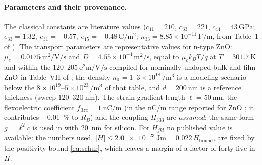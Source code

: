 \paragraph{Parameters and their provenance.}\label{sec:params}
The classical constants are literature values ($c_{11}=210$, $c_{33}=221$, $c_{44}=43\,\si{\giga\pascal}$; $e_{33}=1.32$, $e_{31}=-0.57$, $e_{15}=-0.48\,\si{\coulomb\per\square\metre}$; $\kappa_{33}=8.85\times10^{-11}\,\si{\farad\per\metre}$, from Table~1 of \cite{zhang2025pscplate}).  The transport parameters are representative values for n-type ZnO: $\mu_e=0.0175\,\si{\square\metre\per\volt\per\second}$ and $D=4.55\times10^{-4}\,\si{\square\metre\per\second}$, equal to $\mu_ek_BT/q$ at $T=\SI{301.7}{\kelvin}$ and within the $120$--$\SI{205}{\square\centi\metre\per\volt\per\second}$ compiled for nominally undoped bulk and film ZnO in Table~VII of \cite{ozgur2005zno}; the density $n_0=1$--$3\times10^{18}\,\si{\per\cubic\metre}$ is a modeling scenario below the $8\times10^{19}$--$5\times10^{23}\,\si{\per\cubic\metre}$ of that table, and $d=\SI{200}{\nano\metre}$ is a reference thickness (sweep $120$--$\SI{320}{\nano\metre}$).  The strain-gradient length $\ell=\SI{50}{\nano\metre}$, the flexoelectric coefficient $f_{3zz}=\SI{1}{\nano\coulomb\per\metre}$ (in the nC/m range reported for ZnO \cite{hu2025computational,zhao2021effects}; it contributes \SI{-0.01}{\percent} to $R_B$) and the coupling $H_{333}$ are \emph{assumed}; the same form $g=\ell^2c$ is used in \cite{qu2023drag} with \SI{20}{\nano\metre} for silicon.  For $H_{jkl}$ no published value is available: the numbers used, $|H|\le\SI{2.0e-23}{\joule\metre}=0.022\,H_{\text{bound}}$, are fixed by the positivity bound \eqref{eq:schur}, which leaves a margin of a factor of forty-five in $H$.

